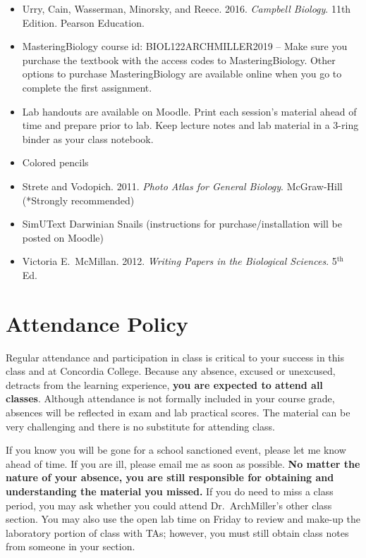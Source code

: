\documentclass{tufte-handout}
\begin{document}
\begin{fullwidth}
\begin{itemize}
	\item Urry, Cain, Wasserman, Minorsky, and Reece. 2016. \emph{Campbell Biology}. 11th Edition. Pearson Education.
	\item MasteringBiology course id: BIOL122ARCHMILLER2019 -- Make sure you purchase the textbook with the access codes to MasteringBiology. Other options to purchase MasteringBiology are available online when you go to complete the first assignment. 
	\item Lab handouts are available on Moodle. Print each session's material ahead of time and prepare prior to lab. Keep lecture notes and lab material in a 3-ring binder as your class notebook. 
	\item Colored pencils
	\item Strete and Vodopich. 2011. \emph{Photo Atlas for General Biology}. McGraw-Hill (*Strongly recommended)
	\item SimUText Darwinian Snails (instructions for purchase/installation will be posted on Moodle)
	\item Victoria E.\ McMillan. 2012. \emph{Writing Papers in the Biological Sciences}. 5$^\mathrm{th}$ Ed.
\end{itemize}

\section{Attendance Policy}

Regular attendance and participation in class is critical to your success in this class and at Concordia College. Because any absence, excused or unexcused, detracts from the learning experience, \textbf{you are expected to attend all classes}. Although attendance is not formally included in your course grade, absences will be reflected in exam and lab practical scores. The material can be very challenging and there is no substitute for attending class. 




If you know you will be gone for a school sanctioned event, please let me know ahead of time. If you are ill, please email me as soon as possible. \textbf{No matter the nature of your absence, you are still responsible for obtaining and understanding the material you missed.} If you do need to miss a class period, you may ask whether you could attend Dr.\ ArchMiller's other class section. You may also use the open lab time on Friday to review and make-up the laboratory portion of class with TAs; however, you must still obtain class notes from someone in your section.  


\end{fullwidth}
\end{document}
